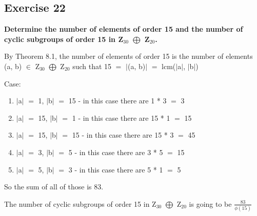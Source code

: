 \documentclass{article}
\newcommand{\mt}[1]{\ensuremath{#1}}
\newcommand\ssc[2][\DefaultOpt]{%
  \def\DefaultOpt{#2}%
  \subsection[#1]{#2}%
}
\newcommand{\elist}{\end{enumerate}}
\newcommand{\bilist}{\begin{enumerate}[label=\roman*)]}
\newcommand{\mem}{\mt{\in} }
\newcommand{\av}[1]{\mt{|}#1\mt{|}}  %
\newcommand{\eql}{\mt{=} }
\newcommand{\uw}[2]{#1\mt{_{#2}}}
\newcommand{\frc}[2]{\mt{\frac{#1}{#2}}}
\newcommand{\edp}{\mt{\bigoplus} }
\begin{document}
{{}
\ssc{Exercise 22}{
\textbf{Determine the number of elements of order 15 and the number of cyclic subgroups of order 15 in \uw{Z}{30} \edp \uw{Z}{20}.}

By Theorem 8.1, the number of elements of order 15 is the number of elements (a, b) \mem \uw{Z}{30} \edp \uw{Z}{20} such that 15 \eql \av{(a, b)} \eql lcm(\av{a}, \av{b})

Case:
\bilist
\item \av{a} \eql 1, \av{b} \eql 15 - in this case there are 1 * 3 \eql 3
\item \av{a} \eql 15, \av{b} \eql 1 - in this case there are 15 * 1 \eql 15
\item \av{a} \eql 15, \av{b} \eql 15 - in this case there are 15 * 3 \eql 45
\item \av{a} \eql 3, \av{b} \eql 5 - in this case there are 3 * 5 \eql 15
\item \av{a} \eql 5, \av{b} \eql 3 - in this case there are 5 * 1 \eql 5
\elist

So the sum of all of those is 83.

The number of cyclic subgroups of order 15 in \uw{Z}{30} \edp \uw{Z}{20} is going to be \frc{83}{\phi(15)}
}
}
\end{document}
